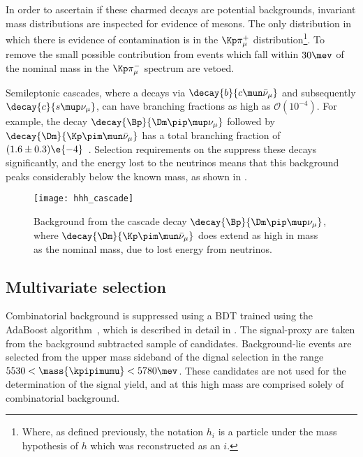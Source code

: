 In order to ascertain if these charmed decays are potential backgrounds, invariant mass
distributions are inspected for evidence of \Dz mesons.
The only distribution in which there is evidence of contamination is in the
$\Kp\pi^+_\mu$ distribution\footnote{
  Where, as defined previously, the notation $h_i$ is a particle under the mass hypothesis of $h$
  which was reconstructed as an $i$.
}.
To remove the small possible contribution from \decay{\Bd}{\Dzb\pip\pipi} events which fall within
$30\mev$ of the nominal \Dz mass in the $\Kp\pi^-_\mu$ spectrum are vetoed.



Semileptonic cascades, where a \bquark decays via $\decay{b}{c\mun\bar\nu_\mu}$ and subsequently
$\decay{c}{s\mup\nu_\mu}$, can have branching fractions as high as $\mathcal{O}(10^{-4})$.
For example, the decay $\decay{\Bp}{\Dm\pip\mup\nu_\mu}$ followed by
$\decay{\Dm}{\Kp\pim\mun\bar\nu_\mu}$ has a total branching fraction of
$(1.6\pm0.3)\e{-4}$~\cite{PDG2014}.
Selection requirements on the \chisqvtx suppress these decays significantly, and the energy lost to
the neutrinos means that this background peaks considerably below the known \Bp mass, as shown in
.

\begin{figure}
  \begin{center}
    \texttt{[image: hhh\_cascade]}
    \caption{\small
      Background from the cascade decay $\decay{\Bp}{\Dm\pip\mup\nu_\mu}$, where
      $\decay{\Dm}{\Kp\pim\mun\bar\nu_\mu}$ does extend as high in mass as the nominal \Bp mass,
      due to lost energy from neutrinos.
    }
    \label{fig:hhh:cascade}
  \end{center}
\end{figure}


\subsection{Multivariate selection}
\label{sec:hhh:bdt}
Combinatorial background is suppressed using a BDT trained using the AdaBoost
algorithm~\cite{AdaBoost}, which is described in detail in .
The signal-proxy are taken from the background subtracted sample of \btojpsikpipi candidates.
Background-lie events are selected from the upper mass sideband of the dignal selection in the
range $5530<\mass{\kpipimumu}<5780\mev$.
These candidates are not used for the determination of the signal yield, and at this high mass are
comprised solely of combinatorial background.

